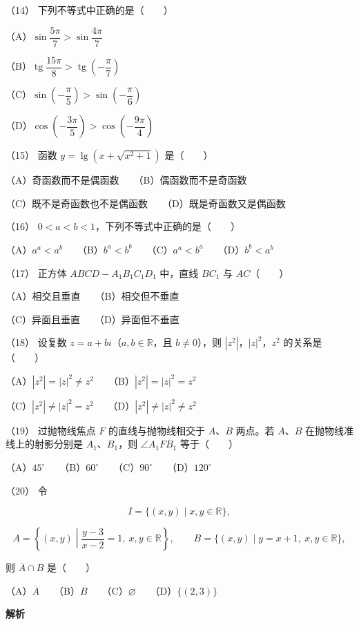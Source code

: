 \begin{answer}
（14） 下列不等式中正确的是\mbox{（　　）}

（A）$\sin\dfrac{5\pi}7>\sin\dfrac{4\pi}7$

（B）$\operatorname{tg}\dfrac{15\pi}8>\operatorname{tg}\left(-\dfrac\pi7\right)$

（C）$\sin\left(-\dfrac\pi5\right)>\sin\left(-\dfrac\pi6\right)$

（D）$\cos\left(-\dfrac{3\pi}5\right)>\cos\left(-\dfrac{9\pi}4\right)$

（15） 函数 $y=\lg\left(x+\sqrt{x^2+1}\right)$ 是\mbox{（　　）}

（A）奇函数而不是偶函数　　（B）偶函数而不是奇函数

（C）既不是奇函数也不是偶函数　　（D）既是奇函数又是偶函数

（16） $0<a<b<1$，下列不等式中正确的是\mbox{（　　）}

（A）$a^a<a^b$　　（B）$b^a<b^b$　　（C）$a^a<b^a$　　（D）$b^b<a^b$

（17） 正方体 $ABCD-A_1B_1C_1D_1$ 中，直线 $BC_1$ 与 $AC$\mbox{（　　）}

（A）相交且垂直　　（B）相交但不垂直

（C）异面且垂直　　（D）异面但不垂直

（18） 设复数 $z=a+bi$（$a,b\in\mathbb R$，且 $b\ne0$），则 $|z^2|$，$|z|^2$，$z^2$ 的关系是\mbox{（　　）}

（A）$|z^2|=|z|^2\ne z^2$　　（B）$|z^2|=|z|^2=z^2$

（C）$|z^2|\ne|z|^2=z^2$　　（D）$|z^2|\ne|z|^2\ne z^2$

（19） 过抛物线焦点 $F$ 的直线与抛物线相交于 $A\text{、}B$ 两点。若 $A\text{、}B$ 在抛物线准线上的射影分别是 $A_1\text{、}B_1$，则 $\angle A_1FB_1$ 等于\mbox{（　　）}

（A）$45^\circ$　　（B）$60^\circ$　　（C）$90^\circ$　　（D）$120^\circ$

（20） 令

\nopagebreak[4]
\[
I=\{(x,y)\mid x,y\in\mathbb R\},
\]

\nopagebreak[4]
\[
A=\left\{(x,y)\middle|\frac{y-3}{x-2}=1,\ x,y\in\mathbb R\right\},
\qquad
B=\{(x,y)\mid y=x+1,\ x,y\in\mathbb R\},
\]

则 $\overline A\cap B$ 是\mbox{（　　）}

（A）$\overline A$　　（B）$B$　　（C）$\varnothing$　　（D）$\{(2,3)\}$

\textbf{解析}



\end{answer}
